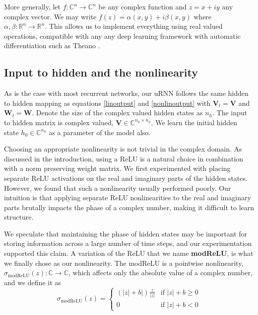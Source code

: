 \documentclass{article} %
\newcommand{\matr}[1]{\mathbf{#1}}
\newcommand\RR{\mathbb{R}}
\newcommand\CC{\mathbb{C}}
\begin{document}
More generally, let $f: \CC^n \rightarrow \CC^n$ be any complex function and $z = x + i y$ 
any complex vector. We may write $ f(z) = \alpha(x, y) + i \beta(x, y) $ where 
$\alpha, \beta : \RR^n \rightarrow \RR^n$. 
This allows us to implement everything using real valued operations, compatible with any
any deep learning framework with automatic differentiation such as Theano \citep{Fred2010}.

\subsection{Input to hidden and the nonlinearity}

As is the case with most recurrent networks, our uRNN follows the same hidden to hidden mapping as 
equations \ref{linoutput} and \ref{nonlinoutput} with $\matr{V}_t = \matr{V}$ and $\matr{W}_t = \matr{W}$. 
Denote the size of the complex valued hidden states as $n_h$.
The input to hidden matrix is complex valued, $\matr{V} \in \CC^{n_h \times n_h}$. 
We learn the initial hidden state $h_0 \in \CC^{n_h}$ as a parameter of the model also.

Choosing an appropriate nonlinearity is not trivial in the complex domain.
As discussed in the introduction, using a ReLU is a natural choice in combination with a norm preserving
weight matrix. We first experimented with placing separate ReLU activations on the real and imaginary
parts of the hidden states.
However, we found that such a nonlinearity usually performed poorly.
Our intuition is that applying separate ReLU nonlinearities to the real 
and imaginary parts brutally impacts the 
phase of a complex number, making it difficult to learn structure.

We speculate that maintaining the phase of hidden states may be important for storing information 
across a large number of time steps, and our experimentation supported this claim.
A variation of the ReLU that we name {\bf modReLU}, is what we 
finally chose as our nonlinearity. The modReLU is a pointwise nonlinearity,  
$\sigma_\mathrm{modReLU} (z) : \CC \rightarrow \CC$, which
affects only the absolute value of a complex number, and we define it as 
\begin{equation} \sigma_\mathrm{modReLU} (z) = 
\left\{
  \begin{array}{ll}
    (|z|+b|) \frac{z}{|z|}  & \mbox{if } |z| + b \geq 0 \\
    0 & \mbox{if } |z| + b < 0
  \end{array}
\right.
\end{equation}
\end{document}
